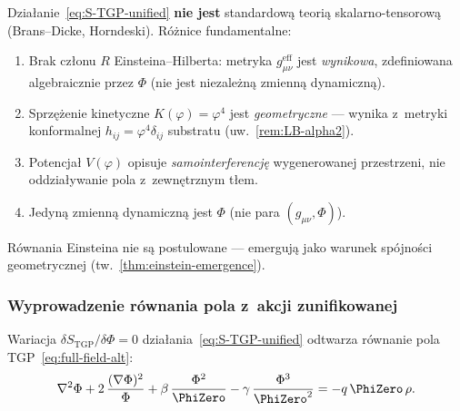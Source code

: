 \begin{remark}%
\label{rem:not-scalar-tensor}
Dzia\l{}anie~\eqref{eq:S-TGP-unified} \textbf{nie jest}
standardow\k{a} teori\k{a} skalarno-tensorow\k{a} (Brans--Dicke,
Horndeski). R\'o\.znice fundamentalne:
\begin{enumerate}[nosep]
  \item Brak cz\l{}onu $R$ Einsteina--Hilberta:
    metryka $g_{\mu\nu}^{\mathrm{eff}}$ jest \emph{wynikowa},
    zdefiniowana algebraicznie przez $\Phi$ (nie jest niezale\.zn\k{a}
    zmienn\k{a} dynamiczn\k{a}).
  \item Sprz\k{e}\.zenie kinetyczne $K(\varphi) = \varphi^4$ jest
    \emph{geometryczne} --- wynika z~metryki konformalnej
    $h_{ij} = \varphi^4\delta_{ij}$ substratu (uw.~\ref{rem:LB-alpha2}).
  \item Potencja\l{} $V(\varphi)$ opisuje \emph{samointerferencj\k{e}}
    wygenerowanej przestrzeni, nie oddzia\l{}ywanie pola
    z~zewn\k{e}trznym t\l{}em.
  \item Jedyn\k{a} zmienn\k{a} dynamiczn\k{a} jest $\Phi$
    (nie para $(g_{\mu\nu},\Phi)$).
\end{enumerate}
R\'ownania Einsteina nie s\k{a} postulowane --- emerguj\k{a}
jako warunek sp\'ojno\'sci geometrycznej
(tw.~\ref{thm:einstein-emergence}).
\end{remark}

\subsubsection{Wyprowadzenie r\'ownania pola z~akcji zunifikowanej}%
\label{sssec:variation-unified}

\begin{proposition}%
\label{prop:field-eq-from-action}

Wariacja $\delta S_{\mathrm{TGP}}/\delta\Phi = 0$
dzia\l{}ania~\eqref{eq:S-TGP-unified} odtwarza r\'ownanie
pola TGP~\eqref{eq:full-field-alt}:
\begin{equation}\label{eq:field-eq-reproduced}
  \nabla^2\Phi + 2\,\frac{(\nabla\Phi)^2}{\Phi}
  + \beta\,\frac{\Phi^2}{\PhiZero}
  - \gamma\,\frac{\Phi^3}{\PhiZero^2}
  = -q\,\PhiZero\,\rho.
\end{equation}
\end{proposition}

